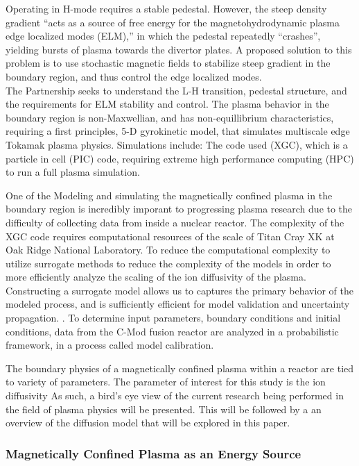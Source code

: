 \documentclass{article}
\begin{document}
Operating in H-mode requires a stable pedestal. However, the steep density gradient “acts as a source of free energy for the magnetohydrodynamic plasma edge localized modes (ELM),” \cite{PPPL_P:2}  in which the pedestal repeatedly “crashes”, yielding bursts of plasma towards the divertor plates. A proposed solution to this problem is to use stochastic magnetic fields to stabilize steep gradient in the boundary region, and thus control the edge localized modes.\\

The Partnership seeks to understand  the L-H transition, pedestal structure, and  the requirements for ELM stability and control.  The plasma behavior in the boundary region is non-Maxwellian, and has non-equillibrium characteristics, requiring a first principles, 5-D gyrokinetic model, that simulates multiscale edge Tokamak plasma physics. Simulations include: The code used  (XGC), which is a particle in cell (PIC) code, requiring extreme high performance computing (HPC) to run a full plasma simulation.

One of the Modeling and simulating the magnetically confined plasma in the boundary region is incredibly imporant to progressing plasma research due to the difficulty of collecting data from inside a nuclear reactor.\cite{Smith_UQ:3} The complexity of the  XGC code requires computational resources of the scale of Titan Cray XK at Oak Ridge National Laboratory. To reduce the computational complexity  to utilize surrogate methods to reduce the complexity of the models in order to more efficiently analyze the scaling of the ion diffusivity of the plasma. Constructing a surrogate model allows us to captures the primary behavior of the modeled process, and is sufficiently efficient for model validation and uncertainty propagation.  \cite{Smith_UQ:3}. To determine input parameters, boundary conditions and initial conditions, data from the C-Mod fusion reactor are analyzed in a probabilistic framework, in a process called model calibration. 

 \cite{PPPL_P:2}
The boundary physics of a magnetically confined plasma within a reactor are tied to variety of parameters. The parameter of interest for this study is the ion diffusivity 
As such, a bird's eye view of the current research being performed in the field of plasma physics will be presented. \cite{J_Friedberg:1}
This will be followed by a an overview of the diffusion model that will be explored in this paper.\\
\subsubsection{Magnetically Confined Plasma as an Energy Source}
\end{document}
